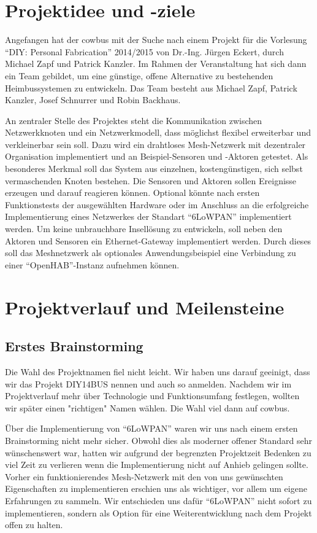 \documentclass{IEEEtran}
\begin{document}
\section{Projektidee und -ziele}
    Angefangen hat der cowbus mit der Suche nach einem Projekt für die Vorlesung 
    \enquote{DIY: Personal Fabrication} 2014/2015 von Dr.-Ing. Jürgen Eckert, durch 
    Michael Zapf und Patrick Kanzler. Im Rahmen der Veranstaltung hat sich dann ein 
    Team gebildet, um eine günstige, offene Alternative zu bestehenden Heimbussystemen 
    zu entwickeln. Das Team besteht aus Michael Zapf, Patrick Kanzler, Josef Schnurrer 
    und Robin Backhaus. 

    An zentraler Stelle des Projektes steht die Kommunikation zwischen Netzwerkknoten 
    und ein Netzwerkmodell, dass möglichst flexibel erweiterbar und verkleinerbar 
    sein soll. 
    Dazu wird ein drahtloses Mesh-Netzwerk mit dezentraler Organisation implementiert 
    und an Beispiel-Sensoren und -Aktoren getestet. 
    Als besonderes Merkmal soll das System aus einzelnen, kostengünstigen, sich 
    selbst vermaschenden Knoten bestehen.
    Die Sensoren und Aktoren sollen Ereignisse erzeugen und darauf reagieren können. 
    Optional könnte nach ersten Funktionstests der ausgewählten Hardware oder im 
    Anschluss an die erfolgreiche Implementierung eines Netzwerkes der Standart 
    \enquote{6LoWPAN} implementiert werden. 
    Um keine unbrauchbare Insellösung zu entwickeln, soll neben den Aktoren und 
    Sensoren ein Ethernet-Gateway implementiert werden. Durch dieses soll das 
    Meshnetzwerk als optionales Anwendungsbeispiel eine Verbindung zu 
    einer \enquote{OpenHAB}-Instanz aufnehmen können.


\section{Projektverlauf und Meilensteine}
    \subsection{Erstes Brainstorming}
    Die Wahl des Projektnamen fiel nicht leicht. Wir haben uns darauf geeinigt, dass 
    wir das Projekt DIY14BUS nennen und auch so anmelden. Nachdem wir im 
    Projektverlauf mehr über Technologie und Funktionsumfang festlegen, wollten wir 
    später einen "richtigen" Namen wählen. Die Wahl viel dann auf cowbus.

    Über die Implementierung von \enquote{6LoWPAN} waren wir uns nach einem ersten 
    Brainstorming nicht mehr sicher. Obwohl dies als moderner offener Standard 
    sehr wünschenswert war, hatten wir aufgrund der begrenzten Projektzeit Bedenken 
    zu viel Zeit zu verlieren wenn die Implementierung nicht auf Anhieb gelingen 
    sollte. Vorher ein funktionierendes Mesh-Netzwerk mit den von uns gewünschten 
    Eigenschaften zu implementieren erschien uns als wichtiger, vor allem um 
    eigene Erfahrungen zu sammeln. Wir entschieden uns dafür \enquote{6LoWPAN} 
    nicht sofort zu implementieren, sondern als Option für eine Weiterentwicklung 
    nach dem Projekt offen zu halten.
\end{document}

